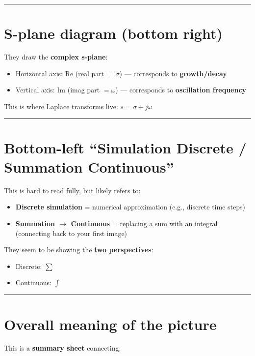 \documentclass[UTF8,a4paper,11pt]{ctexart}
\begin{document}
\bigskip\noindent\rule{\linewidth}{0.4pt}\bigskip

\section{S-plane diagram (bottom right)}

They draw the \textbf{complex s-plane}:

\begin{itemize}
  \item Horizontal axis: $\text{Re}$ (real part $= \sigma$) --- corresponds to \textbf{growth/decay}
  \item Vertical axis: $\text{Im}$ (imag part $= \omega$) --- corresponds to \textbf{oscillation frequency}
\end{itemize}

This is where Laplace transforms live:
$s = \sigma + j\omega$

\bigskip\noindent\rule{\linewidth}{0.4pt}\bigskip

\section{Bottom-left ``Simulation Discrete / Summation Continuous''}

This is hard to read fully, but likely refers to:

\begin{itemize}
  \item \textbf{Discrete simulation} = numerical approximation (e.g., discrete time steps)
  \item \textbf{Summation $\to$ Continuous} = replacing a sum with an integral (connecting back to your first image)
\end{itemize}

They seem to be showing the \textbf{two perspectives}:

\begin{itemize}
  \item Discrete: $\sum$
  \item Continuous: $\int$
\end{itemize}

\bigskip\noindent\rule{\linewidth}{0.4pt}\bigskip

\section{Overall meaning of the picture}

This is a \textbf{summary sheet} connecting:
\end{document}

